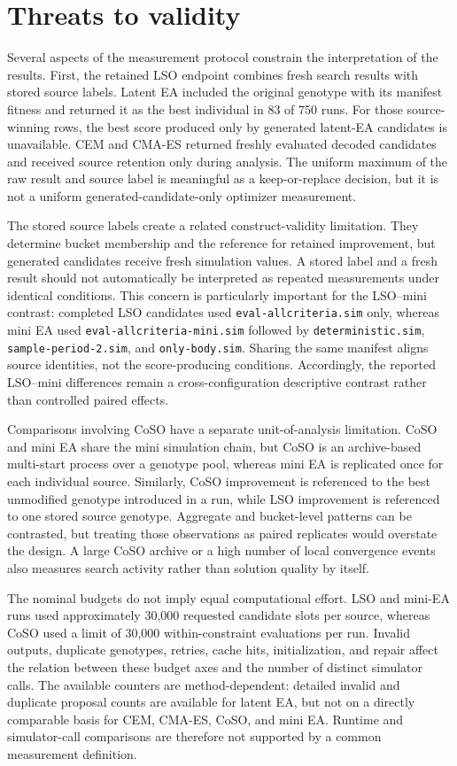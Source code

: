 \section{Threats to validity}

Several aspects of the measurement protocol constrain the interpretation of the results. First, the retained LSO endpoint combines fresh search results with stored source labels. Latent EA included the original genotype with its manifest fitness and returned it as the best individual in 83 of 750 runs. For those source-winning rows, the best score produced only by generated latent-EA candidates is unavailable. CEM and CMA-ES returned freshly evaluated decoded candidates and received source retention only during analysis. The uniform maximum of the raw result and source label is meaningful as a keep-or-replace decision, but it is not a uniform generated-candidate-only optimizer measurement.

The stored source labels create a related construct-validity limitation. They determine bucket membership and the reference for retained improvement, but generated candidates receive fresh simulation values. A stored label and a fresh result should not automatically be interpreted as repeated measurements under identical conditions. This concern is particularly important for the LSO--mini contrast: completed LSO candidates used \texttt{eval-allcriteria.sim} only, whereas mini EA used \texttt{eval-allcriteria-mini.sim} followed by \texttt{deterministic.sim}, \texttt{sample-period-2.sim}, and \texttt{only-body.sim}. Sharing the same manifest aligns source identities, not the score-producing conditions. Accordingly, the reported LSO--mini differences remain a cross-configuration descriptive contrast rather than controlled paired effects.

Comparisons involving CoSO have a separate unit-of-analysis limitation. CoSO and mini EA share the mini simulation chain, but CoSO is an archive-based multi-start process over a genotype pool, whereas mini EA is replicated once for each individual source. Similarly, CoSO improvement is referenced to the best unmodified genotype introduced in a run, while LSO improvement is referenced to one stored source genotype. Aggregate and bucket-level patterns can be contrasted, but treating those observations as paired replicates would overstate the design. A large CoSO archive or a high number of local convergence events also measures search activity rather than solution quality by itself.

The nominal budgets do not imply equal computational effort. LSO and mini-EA runs used approximately 30,000 requested candidate slots per source, whereas CoSO used a limit of 30,000 within-constraint evaluations per run. Invalid outputs, duplicate genotypes, retries, cache hits, initialization, and repair affect the relation between these budget axes and the number of distinct simulator calls. The available counters are method-dependent: detailed invalid and duplicate proposal counts are available for latent EA, but not on a directly comparable basis for CEM, CMA-ES, CoSO, and mini EA. Runtime and simulator-call comparisons are therefore not supported by a common measurement definition.

